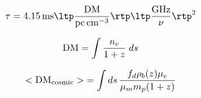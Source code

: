 \documentclass[12pt,letterpaper]{article}
\begin{document}
{\Large

\begin{equation}
\tau = 4.15 \, {\rm ms} \ltp \frac{{\rm DM}}{\rm pc \, cm^{-3}} \rtp
                        \ltp \frac{{\rm GHz}}{\nu} \rtp^2
\end{equation}

\begin{equation}
{\rm DM} = \int \frac{n_e}{1+z} \; ds
\end{equation}

\begin{equation}
<{\rm DM}_{\rm cosmic}> \; = \int ds \, \frac{f_d \rho_b(z) \mu_e}{\mu_m m_p (1+z)}
\end{equation}


}
\end{document}
